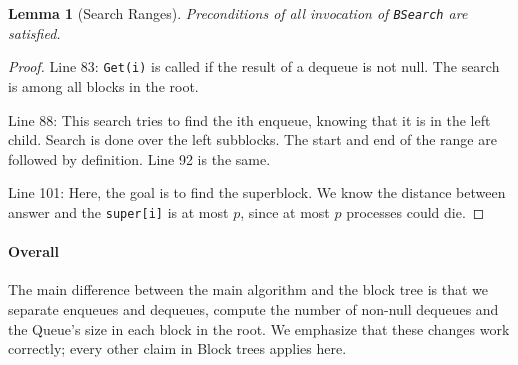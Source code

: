 \documentclass[10pt]{article}
\newtheorem{lemma}[theorem]{Lemma}
\theoremstyle{definition}
\begin{document}
\begin{lemma}[Search Ranges]\label{search}
  Preconditions of all invocation of \texttt{BSearch} are satisfied.
\end{lemma}
\begin{proof}
  
Line 83: \texttt{Get(i)} is called if the result of a dequeue is not null. The search is among all blocks in the root.

Line 88: This search tries to find the ith enqueue, knowing that it is in the left child. Search is done over the left subblocks. The start and end of the range are followed by definition. Line 92 is the same.

Line 101: Here, the goal is to find the superblock. We know the distance between answer and the \texttt{super[i]} is at most $p$, since at most $p$ processes could die.

\end{proof}

\paragraph{Overall}

The main difference between the main algorithm and the block tree is that we separate enqueues and dequeues, compute the number of non-null dequeues and the Queue's size in each block in the root. We emphasize that these changes work correctly; every other claim in Block trees applies here.
\end{document}
